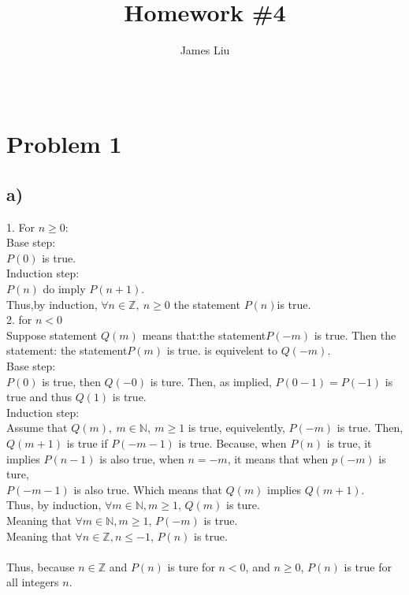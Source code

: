 \documentclass{article}
\title{\textbf{Homework \#4 }}
\author{James Liu}
\date{\ }
\begin{document}
\maketitle

\section*{Problem 1}
    \subsection*{a)}
        1. For \(n\geqslant0\):\\
        Base step:\\
        \(P(0)\) is true.\\
        Induction step:\\
        \(P(n)\) do imply \(P(n+1)\).\\
        Thus,by induction, \(\forall n\in \mathbb{Z}, \ n\geqslant 0\) the statement \(P(n)\)is true.\\
        2. for \(n<0\)\\
        Suppose statement \(Q(m)\) means that:the statement\(P(-m)\) is true.
        Then the statement: the statement\(P(m)\) is true. is equivelent to \(Q(-m)\).\\
        Base step:\\
        \(P(0)\) is true, then \(Q(-0)\) is ture. Then, as implied, \(P(0-1)=P(-1)\) is true and thus \(Q(1)\) is true.\\
        Induction step:\\
        Assume that \(Q(m),\ m\in\mathbb{N},\ m\geqslant 1\) is true, equivelently, \(P(-m)\) is true. Then, \(Q(m+1)\) is true if \(P(-m-1)\) is true.
        Because, when \(P(n)\) is true, it implies \(P(n-1)\) is also true, when \(n=-m\), it means that when \(p(-m)\) is ture, \\
        \(P(-m-1)\) is also true. Which means that \(Q(m)\) implies \(Q(m+1)\).\\
        Thus, by induction, \(\forall m\in \mathbb{N}, m\geqslant 1\), \(Q(m)\) is ture.\\
        Meaning that \(\forall m\in \mathbb{N}, m\geqslant 1\), \(P(-m)\) is true.\\
        Meaning that \(\forall n\in \mathbb{Z}, n\leqslant -1\), \(P(n)\) is true.\\
        \\
        Thus, because \(n\in\mathbb{Z}\) and \(P(n)\) is ture for \(n<0\), and \(n\geqslant 0\), \(P(n)\) is true for all integers \(n\).
\end{document}
